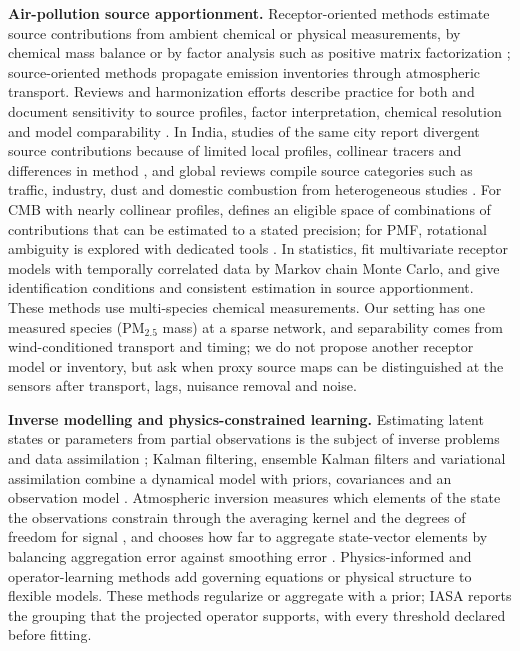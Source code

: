\noindent\textbf{Air-pollution source apportionment.}
Receptor-oriented methods estimate source contributions from ambient chemical or
physical measurements, by chemical mass balance or by factor analysis such as positive
matrix factorization \citep{watson2002receptor,paatero1994positive,hopke2016review};
source-oriented methods propagate emission inventories through atmospheric transport.
Reviews and harmonization efforts describe practice for both and document sensitivity
to source profiles, factor interpretation, chemical resolution and model comparability
\citep{viana2008source,belis2013critical,belis2019european,mircea2020european,hopke2020global}.
In India, studies of the same city report divergent source contributions because of
limited local profiles, collinear tracers and differences in method
\citep{pant2012critical}, and global reviews compile source categories such as
traffic, industry, dust and domestic combustion from heterogeneous studies
\citep{karagulian2015contributions}.  For CMB with nearly collinear profiles,
\citet{henry1992dealing} defines an eligible space of combinations of contributions
that can be estimated to a stated precision; for PMF, rotational ambiguity is
explored with dedicated tools \citep{paatero2002understanding}.  In statistics,
\citet{park2001multivariate} fit multivariate receptor models with temporally
correlated data by Markov chain Monte Carlo, and \citet{jin2025identification} give
identification conditions and consistent estimation in source apportionment.  These
methods use multi-species chemical measurements.  Our setting has one measured species
(PM\(_{2.5}\) mass) at a sparse network, and separability comes from wind-conditioned
transport and timing; we do not propose another receptor model or inventory, but ask
when proxy source maps can be distinguished at the sensors after transport, lags,
nuisance removal and noise.

\noindent\textbf{Inverse modelling and physics-constrained learning.}
Estimating latent states or parameters from partial observations is the subject of
inverse problems and data assimilation
\citep{tarantola2005inverse,engl1996regularization}; Kalman filtering, ensemble Kalman
filters and variational assimilation combine a dynamical model with priors,
covariances and an observation model \citep{wang2023kalman,carrassi2018data}.
Atmospheric inversion measures which elements of the state the observations constrain
through the averaging kernel and the degrees of freedom for signal
\citep{rodgers2000inverse}, and chooses how far to aggregate state-vector elements by
balancing aggregation error against smoothing error \citep{turner2015balancing}.
Physics-informed and operator-learning methods
\citep{raissi2019physics,li2024physics,li2020fourier,bhardwaj2025fieldformer} add
governing equations or physical structure to flexible models.  These methods
regularize or aggregate with a prior; IASA reports the grouping that the projected
operator supports, with every threshold declared before fitting.

